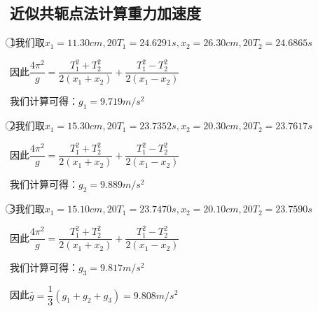 \documentclass[a4 paper,12pt]{article}
\begin{document}
\subsection{近似共轭点法计算重力加速度}
\textcircled{1}我们取$x_{1}=11.30cm,20T_{1}=24.6291s,x_{2}=26.30cm,20T_{2}=24.6865s$
\par 因此$\dfrac{4\pi^{2}}{g}=\dfrac{T_{1}^{2}+T_{2}^{2}}{2(x_{1}+x_{2})}+\dfrac{T_{1}^{2}-T_{2}^{2}}{2(x_{1}-x_{2})}$
\par 我们计算可得：$g_{1}=9.719m/s^{2}$
\par \textcircled{2}我们取$x_{1}=15.30cm,20T_{1}=23.7352s,x_{2}=20.30cm,20T_{2}=23.7617s$
\par 因此$\dfrac{4\pi^{2}}{g}=\dfrac{T_{1}^{2}+T_{2}^{2}}{2(x_{1}+x_{2})}+\dfrac{T_{1}^{2}-T_{2}^{2}}{2(x_{1}-x_{2})}$
\par 我们计算可得：$g_{2}=9.889m/s^{2}$
\par \textcircled{3}我们取$x_{1}=15.10cm,20T_{1}=23.7470s,x_{2}=20.10cm,20T_{2}=23.7590s$
\par 因此$\dfrac{4\pi^{2}}{g}=\dfrac{T_{1}^{2}+T_{2}^{2}}{2(x_{1}+x_{2})}+\dfrac{T_{1}^{2}-T_{2}^{2}}{2(x_{1}-x_{2})}$
\par 我们计算可得：$g_{3}=9.817m/s^{2}$
\par 因此$\bar{g}=\dfrac{1}{3}(g_{1}+g_{2}+g_{3})=9.808m/s^{2}$
\end{document}
